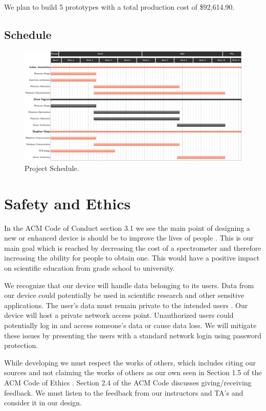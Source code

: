 \documentclass{article}
\begin{document}
We plan to build 5 prototypes with a total production cost of \$92,614.90.

\subsection{Schedule}
    \begin{figure}[H]
    \centering
    \includegraphics[width=\textwidth]{images/senior_design_schedule.pdf}
    \caption{\label{fig:schedule}Project Schedule.}
    \end{figure}
\section{Safety and Ethics}

In the ACM Code of Conduct section 3.1 we see the main point of designing a new or enhanced device is should be to improve the lives of people \cite{ACMConduct}. This is our main goal which is reached by decreasing the cost of a spectrometer and therefore increasing the ability for people to obtain one. This would have a positive impact on scientific education from grade school to university.

We recognize that our device will handle data belonging to its users. Data from our device could potentially be used in scientific research and other sensitive applications. The user's data must remain private to the intended users \cite{ACMConduct}. Our device will host a private network access point. Unauthorized users could potentially log in and access someone's data or cause data loss. We will mitigate these issues by presenting the users with a standard network login using password protection.

While developing we must respect the works of others, which includes citing our sources and not claiming the works of others as our own seen in Section 1.5 of the ACM Code of Ethics \cite{ACMConduct}. Section 2.4 of the ACM Code discusses giving/receiving feedback. We must listen to the feedback from our instructors and TA's and consider it in our design.                        
                        
                        
\clearpage
\newpage


\end{document}
